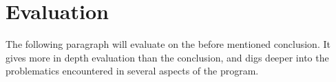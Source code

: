 \section{Evaluation}
\label{sec:eval}

The following paragraph will evaluate on the before mentioned conclusion. It gives more in depth evaluation than the conclusion, and digs deeper into the problematics encountered in several aspects of the program.





